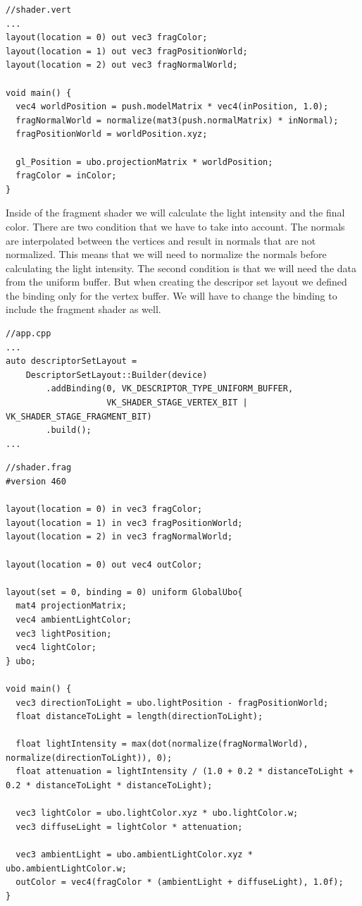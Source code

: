 \documentclass[12pt]{report} \usepackage{preamble}
\begin{document}
\begin{lstlisting}[Language=C++]
//shader.vert
...
layout(location = 0) out vec3 fragColor;
layout(location = 1) out vec3 fragPositionWorld;
layout(location = 2) out vec3 fragNormalWorld;

void main() {
  vec4 worldPosition = push.modelMatrix * vec4(inPosition, 1.0);
  fragNormalWorld = normalize(mat3(push.normalMatrix) * inNormal);
  fragPositionWorld = worldPosition.xyz;

  gl_Position = ubo.projectionMatrix * worldPosition;
  fragColor = inColor;
}
\end{lstlisting}

Inside of the fragment shader we will calculate the light intensity and the final color.
There are two condition that we have to take into account. The normals are interpolated between the vertices and result in normals that are not normalized.
This means that we will need to normalize the normals before calculating the light intensity.
The second condition is that we will need the data from the uniform buffer. But when creating the descripor set layout we defined the binding only for the vertex buffer.
We will have to change the binding to include the fragment shader as well.

\begin{lstlisting}[Language=C++]
//app.cpp
...
auto descriptorSetLayout =
    DescriptorSetLayout::Builder(device)
        .addBinding(0, VK_DESCRIPTOR_TYPE_UNIFORM_BUFFER,
                    VK_SHADER_STAGE_VERTEX_BIT | VK_SHADER_STAGE_FRAGMENT_BIT)
        .build();
...
\end{lstlisting}

\begin{lstlisting}[Language=C++]
//shader.frag
#version 460

layout(location = 0) in vec3 fragColor;
layout(location = 1) in vec3 fragPositionWorld;
layout(location = 2) in vec3 fragNormalWorld;

layout(location = 0) out vec4 outColor;

layout(set = 0, binding = 0) uniform GlobalUbo{
  mat4 projectionMatrix;
  vec4 ambientLightColor;
  vec3 lightPosition;
  vec4 lightColor;
} ubo;

void main() {
  vec3 directionToLight = ubo.lightPosition - fragPositionWorld;
  float distanceToLight = length(directionToLight);

  float lightIntensity = max(dot(normalize(fragNormalWorld), normalize(directionToLight)), 0);
  float attenuation = lightIntensity / (1.0 + 0.2 * distanceToLight + 0.2 * distanceToLight * distanceToLight);

  vec3 lightColor = ubo.lightColor.xyz * ubo.lightColor.w;
  vec3 diffuseLight = lightColor * attenuation;

  vec3 ambientLight = ubo.ambientLightColor.xyz * ubo.ambientLightColor.w;
  outColor = vec4(fragColor * (ambientLight + diffuseLight), 1.0f);
}
\end{lstlisting}
\end{document}

